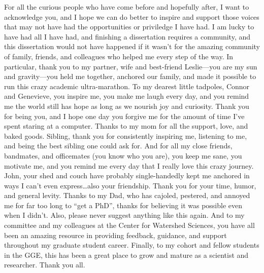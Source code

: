 \documentclass[proquest,12pt,final]{ucthesis-CA2012} %
\begin{document}
\begin{ucfrontmatter}
\begin{dedication}
\begin{center}
\begin{Large}
      \end{Large}
      \end{center}
  \end{dedication}
  \begin{acknowledgements}
    For all the curious people who have come before and hopefully after, I
    want to acknowledge you, and I hope we can do better to inspire and
    support those voices that may not have had the opportunities or
    priviledge I have had. I am lucky to have had all I have had, and
    finishing a dissertation requires a community, and this dissertation
    would not have happened if it wasn't for the amazing community of
    family, friends, and colleagues who helped me every step of the way. In
    particular, thank you to my partner, wife and best-friend Leslie---you
    are my sun and gravity---you held me together, anchored our family, and
    made it possible to run this crazy academic ultra-marathon. To my
    dearest little tadpoles, Connor and Genevieve, you inspire me, you make
    me laugh every day, and you remind me the world still has hope as long
    as we nourish joy and curiosity. Thank you for being you, and I hope one
    day you forgive me for the amount of time I've spent staring at a
    computer. Thanks to my mom for all the support, love, and baked goods.
    Sibling, thank you for consistently inspiring me, listening to me, and
    being the best sibling one could ask for. And for all my close friends,
    bandmates, and officemates (you know who you are), you keep me sane, you
    motivate me, and you remind me every day that I really love this crazy
    journey. John, your shed and couch have probably single-handedly kept me
    anchored in ways I can't even express\ldots{}also your friendship. Thank
    you for your time, humor, and general levity. Thanks to my Dad, who has
    cajoled, pestered, and annoyed me for far too long to ``get a PhD'',
    thanks for believing it was possible even when I didn't. Also, please
    never suggest anything like this again. And to my committee and my
    colleagues at the Center for Watershed Sciences, you have all been an
    amazing resource in providing feedback, guidance, and support throughout
    my graduate student career. Finally, to my cohort and fellow students in
    the GGE, this has been a great place to grow and mature as a scientist
    and researcher. Thank you all.
  \end{acknowledgements}


\end{ucfrontmatter}
\end{document}
